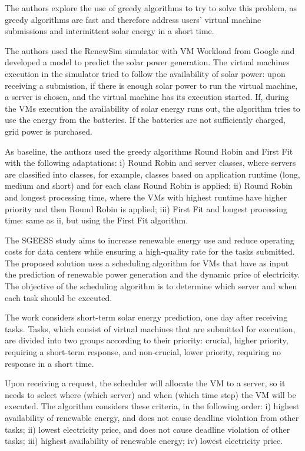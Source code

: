 \documentclass[12pt,a4paper]{article}
\begin{document}
The authors explore the use of greedy algorithms to try to solve this problem, as greedy algorithms are fast and therefore address users' virtual machine submissions and intermittent solar energy in a short time.


The authors used the RenewSim simulator with VM Workload from Google and developed a model to predict the solar power generation. The virtual machines execution in the simulator tried to follow the availability of solar power: upon receiving a submission, if there is enough solar power to run the virtual machine, a server is chosen, and the virtual machine has its execution started. If, during the VMs execution the availability of solar energy runs out, the algorithm tries to use the energy from the batteries. If the batteries are not sufficiently charged, grid power is purchased.

As baseline, the authors used the greedy algorithms Round Robin and First Fit with the following adaptations: i) Round Robin and server classes, where servers are classified into classes, for example, classes based on application runtime  (long, medium and short) and for each class Round Robin is applied; ii) Round Robin and longest processing time, where the VMs with highest runtime have higher priority and then Round Robin is applied; iii) First Fit and longest processing time: same as ii, but using the First Fit algorithm.

The SGEESS \citep{sgeess} study aims to increase renewable energy use and reduce operating costs for data centers while ensuring a high-quality rate for the tasks submitted. The proposed solution uses a scheduling algorithm for VMs that have as input the prediction of renewable power generation and the dynamic price of electricity. The objective of the scheduling algorithm is to determine which server and when each task should be executed.

The work considers short-term solar energy prediction, one day after receiving tasks. Tasks, which consist of virtual machines that are submitted for execution, are divided into two groups according to their priority: crucial, higher priority, requiring a short-term response, and non-crucial, lower priority, requiring no response in a short time.

Upon receiving a request, the scheduler will allocate the VM to a server, so it needs to select where (which server) and when (which time step) the VM will be executed. The algorithm considers these criteria, in the following order: i)   highest availability of renewable energy, and does not cause deadline violation from other tasks; ii)  lowest electricity price, and does not cause deadline violation of other tasks; iii)  highest availability of renewable energy; iv)   lowest electricity price.
\end{document}

